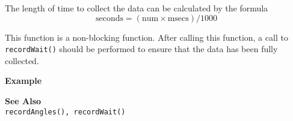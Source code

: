 The length of time to collect the data can be calculated by the formula \\
\begin{equation*}
\text{seconds} = (\text{num} \times \text{msecs}) / 1000
\end{equation*}

This function is a non-blocking function. After calling this function, a call to
\texttt{recordWait()} should be performed to ensure that the data has been fully collected.

\noindent
{\bf Example}\\
\noindent

\noindent
{\bf See Also}\\
\texttt{recordAngles(), recordWait()}
